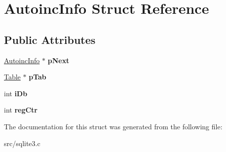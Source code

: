 \hypertarget{struct_autoinc_info}{\section{Autoinc\-Info Struct Reference}
\label{struct_autoinc_info}
}
\subsection*{Public Attributes}
\begin{DoxyCompactItemize}
\item 
\hypertarget{struct_autoinc_info_aa77fb076beea013c25df4e49dba4b6f6}{\hyperlink{struct_autoinc_info}{Autoinc\-Info} $\ast$ {\bfseries p\-Next}}\label{struct_autoinc_info_aa77fb076beea013c25df4e49dba4b6f6}

\item 
\hypertarget{struct_autoinc_info_a0cf785b0cbaddb4215a8408f8e13075e}{\hyperlink{struct_table}{Table} $\ast$ {\bfseries p\-Tab}}\label{struct_autoinc_info_a0cf785b0cbaddb4215a8408f8e13075e}

\item 
\hypertarget{struct_autoinc_info_ae7234e0916b11ef97377bdfd6c7c4568}{int {\bfseries i\-Db}}\label{struct_autoinc_info_ae7234e0916b11ef97377bdfd6c7c4568}

\item 
\hypertarget{struct_autoinc_info_af180977ee7dcc8cab862185692f57cc5}{int {\bfseries reg\-Ctr}}\label{struct_autoinc_info_af180977ee7dcc8cab862185692f57cc5}

\end{DoxyCompactItemize}


The documentation for this struct was generated from the following file\-:\begin{DoxyCompactItemize}
\item 
src/sqlite3.\-c\end{DoxyCompactItemize}
